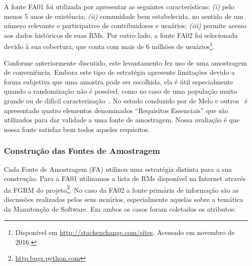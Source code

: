 A fonte FA01 foi utilizada por apresentar as seguintes características:
\textit{(i)} pelo menos 5 anos de existência; \textit{(ii)} comunidade bem
estabelecida, no sentido de um número relevante e participativo de
contribuidores e usuários; \textit{(iii)} permite acesso aos dados históricos de
suas RMs. Por outro lado, a fonte FA02 foi selecionada devido à sua cobertura,
que conta com mais de 6 milhões de usuários\footnote{Disponível em
    \url{http://stackexchange.com/sites}. Acessado em novembro de 2016.}.

Conforme anteriormente discutido, este levantamento fez uso de uma amostragem de
conveniência. Embora este tipo de estratégia apresente limitações devido a forma
subjetiva que uma amostra pode ser escolhida, ela é útil especialmente quando a
randomização não é possível, como no caso de uma população muito grande ou de
difícil caracterização~\cite{boxill1997introduction}. No estudo conduzido por de
Melo e outros~\cite{de2014towards} é apresentado quatro elementos denominados
``Requisitos Essenciais'' que são utilizados para dar validade a uma fonte de
amostragem. Nossa avaliação é que nossa fonte satisfaz bem todos aqueles
requisitos.



\subsubsection{Construção das Fontes de Amostragem}
\label{subsubsec:construcao_fonte_amostragem}

Cada Fonte de Amostragem (FA) utilizou uma estratégia distinta para a sua
construção. Para a FA01 utilizamos a lista de RMs disponível na Internet através
da FGRM do projeto\footnote{\url{http:bugs.python.com}}. No caso da FA02 a fonte
primária de informação são as discussões realizadas pelos seus usuários,
especialmente aquelas sobre a temática da Manutenção de Software. Em ambos os
casos foram coletados os atributos:

